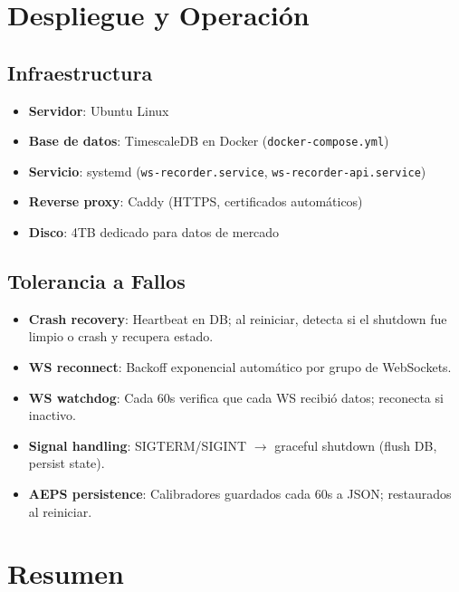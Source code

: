 \documentclass[11pt,a4paper]{article}
\newcommand{\code}[1]{\texttt{\small #1}}
\begin{document}
\section{Despliegue y Operaci\'on}
\label{sec:deployment}

\subsection{Infraestructura}

\begin{itemize}[leftmargin=2em]
\item \textbf{Servidor}: Ubuntu Linux
\item \textbf{Base de datos}: TimescaleDB en Docker (\code{docker-compose.yml})
\item \textbf{Servicio}: systemd (\code{ws-recorder.service}, \code{ws-recorder-api.service})
\item \textbf{Reverse proxy}: Caddy (HTTPS, certificados autom\'aticos)
\item \textbf{Disco}: 4TB dedicado para datos de mercado
\end{itemize}

\subsection{Tolerancia a Fallos}

\begin{itemize}[leftmargin=2em]
\item \textbf{Crash recovery}: Heartbeat en DB; al reiniciar, detecta si el shutdown
  fue limpio o crash y recupera estado.
\item \textbf{WS reconnect}: Backoff exponencial autom\'atico por grupo de WebSockets.
\item \textbf{WS watchdog}: Cada 60s verifica que cada WS recibi\'o datos; reconecta si inactivo.
\item \textbf{Signal handling}: SIGTERM/SIGINT $\to$ graceful shutdown (flush DB, persist state).
\item \textbf{AEPS persistence}: Calibradores guardados cada 60s a JSON; restaurados al reiniciar.
\end{itemize}


\section{Resumen}
\label{sec:summary}
\end{document}
